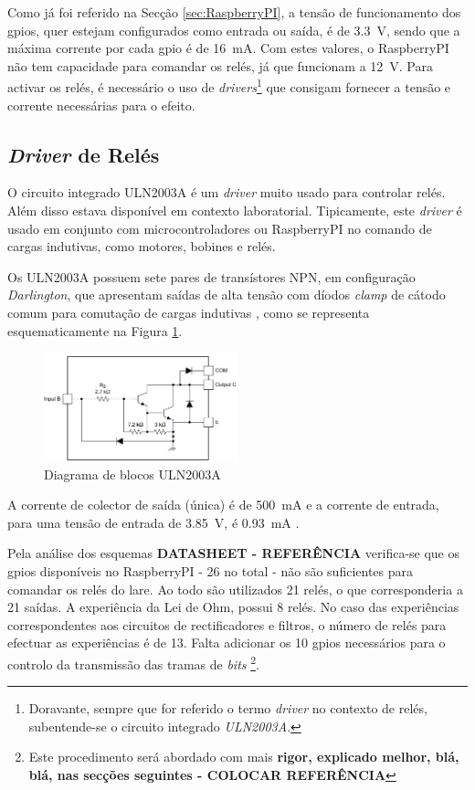 Como já foi referido na Secção \ref{sec:RaspberryPI}, a tensão de funcionamento dos \acrshort{gpio}s, quer estejam configurados como entrada ou saída, é de \SI{3.3}{\volt}, sendo que a máxima corrente por cada \acrshort{gpio} é de \SI{16}{\mA}.
Com estes valores, o \gls{RaspberryPI} não tem capacidade para comandar os relés, já que funcionam a \SI{12}{\volt}. Para activar os relés, é necessário o uso de \textit{drivers}\footnote{Doravante, sempre que for referido o termo \textit{driver} no contexto de relés, subentende-se o circuito integrado \textit{ULN2003A}.} que consigam fornecer a tensão e corrente necessárias para o efeito.

\subsection{\textit{Driver} de Relés}
\label{sec:driver}
O circuito integrado ULN2003A é um \textit{driver} muito usado para controlar relés. Além disso estava disponível em contexto laboratorial.
Tipicamente, este \textit{driver} é usado em conjunto com microcontroladores ou \gls{RaspberryPI} no comando de cargas indutivas, como motores, bobines e relés.

Os ULN2003A possuem sete pares de transístores NPN, em configuração \textit{Darlington}, que apresentam saídas de alta tensão com díodos \textit{clamp} de cátodo comum para comutação de cargas indutivas \cite{ULN2003}, como se  representa esquematicamente na Figura \ref{fig:2003blocos}.

\begin{figure}[hbtp]
    \centering
    \includegraphics[width=0.5\textwidth]{figures/2003A_Darling.png}
    \caption{Diagrama de blocos ULN2003A \cite{ULN2003}}
    \label{fig:2003blocos}
\end{figure}

A corrente de colector de saída (única) é de \SI{500}{\mA} e a corrente de entrada, para uma tensão de entrada de \SI{3.85}{\volt}, é \SI{0.93}{\mA} \cite{ULN2003}.

Pela análise dos esquemas \textbf{DATASHEET - REFERÊNCIA} verifica-se que os \acrshort{gpio}s disponíveis no \gls{RaspberryPI} - 26 no total - não são suficientes para comandar os relés do \acrshort{lare}. Ao todo são utilizados 21 relés, o que corresponderia a 21 saídas. A experiência da Lei de Ohm, possui 8 relés. No caso das experiências correspondentes aos circuitos de rectificadores e filtros, o número de relés para efectuar as experiências é de 13. Falta adicionar os 10 \acrshort{gpio}s necessários para o controlo da transmissão das tramas de \textit{bits} \footnote{Este procedimento será abordado com mais \textbf{rigor, explicado melhor, blá, blá, nas secções seguintes - COLOCAR REFERÊNCIA}}.

